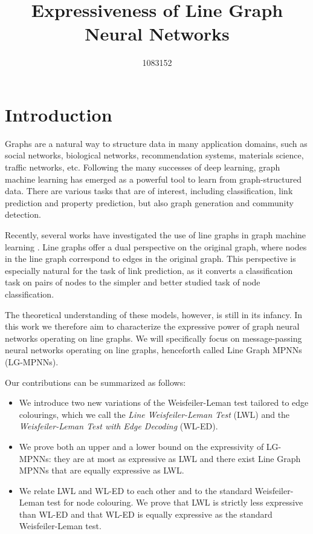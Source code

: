 \documentclass{article}
\title{Expressiveness of Line Graph Neural Networks}
\author{%
    1083152
}
\begin{document}
\maketitle


\begin{abstract}

\end{abstract}


\section{Introduction}
Graphs are a natural way to structure data in many application domains, such as social networks, biological networks, recommendation systems, materials science, traffic networks, etc.
Following the many successes of deep learning, graph machine learning has emerged as a powerful tool to learn from graph-structured data. There are various tasks that are of interest, including classification, link prediction and property prediction, but also graph generation and community detection.

Recently, several works have investigated the use of line graphs in graph machine learning \cite{cai2021line,choudhary2021atomistic}. Line graphs offer a dual perspective on the original graph, where nodes in the line graph correspond to edges in the original graph. This perspective is especially natural for the task of link prediction, as it converts a classification task on pairs of nodes to the simpler and better studied task of node classification.

The theoretical understanding of these models, however, is still in its infancy.
In this work we therefore aim to characterize the expressive power of graph neural networks operating on line graphs. We will specifically focus on message-passing neural networks operating on line graphs, henceforth called Line Graph MPNNs (LG-MPNNs).

Our contributions can be summarized as follows:
\begin{itemize}
    \item We introduce two new variations of the Weisfeiler-Leman test tailored to edge colourings, which we call the \emph{Line Weisfeiler-Leman Test} (LWL) and the \emph{Weisfeiler-Leman Test with Edge Decoding} (WL-ED).
    \item We prove both an upper and a lower bound on the expressivity of LG-MPNNs: they are at most as expressive as LWL and there exist Line Graph MPNNs that are equally expressive as LWL.
    \item We relate LWL and WL-ED to each other and to the standard Weisfeiler-Leman test for node colouring. We prove that LWL is strictly less expressive than WL-ED and that WL-ED is equally expressive as the standard Weisfeiler-Leman test.
\end{itemize}
\end{document}
